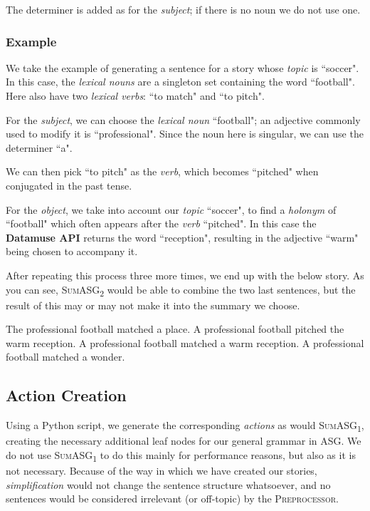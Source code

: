 The determiner is added as for the \textit{subject}; if there is no noun we do not use one.

\subsubsection{Example}

We take the example of generating a sentence for a story whose \textit{topic} is ``soccer". In this case, the \textit{lexical nouns} are a singleton set containing the word ``football". Here also have two \textit{lexical verbs}: ``to match" and ``to pitch".

For the \textit{subject}, we can choose the \textit{lexical noun} ``football"; an adjective commonly used to modify it is ``professional". Since the noun here is singular, we can use the determiner ``a".

We can then pick ``to pitch" as the \textit{verb}, which becomes ``pitched" when conjugated in the past tense.

For the \textit{object}, we take into account our \textit{topic} ``soccer", to find a \textit{holonym} of ``football" which often appears after the \textit{verb} ``pitched". In this case the \textbf{Datamuse API} returns the word ``reception", resulting in the adjective ``warm" being chosen to accompany it.

After repeating this process three more times, we end up with the below story. As you can see, \textsc{SumASG\textsubscript{2}} would be able to combine the two last sentences, but the result of this may or may not make it into the summary we choose.

\begin{displayquote}
The professional football matched a place. A professional football pitched the warm reception. A professional football matched a warm reception. A professional football matched a wonder.
\end{displayquote}

\subsection{Action Creation}

Using a Python script, we generate the corresponding \textit{actions} as would \textsc{SumASG\textsubscript{1}}, creating the necessary additional leaf nodes for our general grammar in ASG. We do not use \textsc{SumASG\textsubscript{1}} to do this mainly for performance reasons, but also as it is not necessary. Because of the way in which we have created our stories, \textit{simplification} would not change the sentence structure whatsoever, and no sentences would be considered irrelevant (or off-topic) by the \textsc{Preprocessor}.

